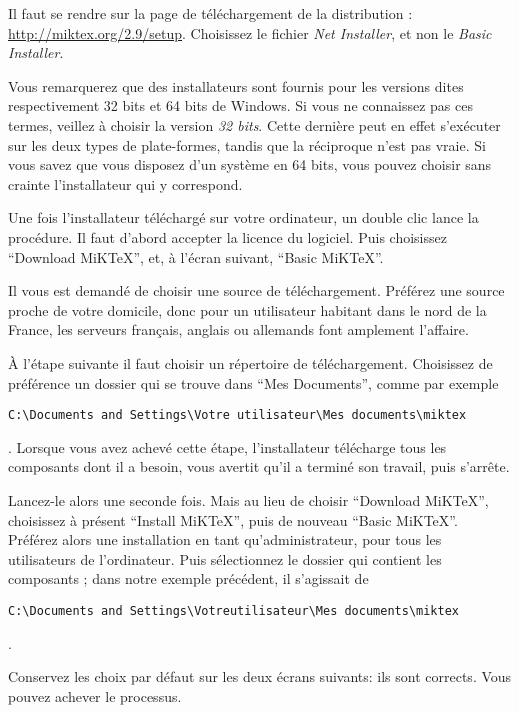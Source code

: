 Il faut se rendre sur la page de téléchargement de la distribution : \url{http://miktex.org/2.9/setup}. Choisissez le fichier \emph{Net Installer}, et non le \emph{Basic Installer}.

\begin{attention}
Vous remarquerez que des installateurs sont fournis pour les versions dites respectivement 32 bits et 64 bits de Windows. Si vous ne connaissez pas ces termes, veillez à choisir la version \emph{32 bits}. Cette dernière peut en effet s'exécuter sur les deux types de plate-formes, tandis que la réciproque n'est pas vraie. Si vous savez que vous disposez d'un système en 64 bits, vous pouvez choisir sans crainte l'installateur qui y correspond.
\end{attention}

Une fois l'installateur téléchargé sur votre ordinateur, un double clic lance la procédure. Il faut d'abord accepter la licence du logiciel. Puis choisissez \enquote{Download MiKTeX}, et, à l'écran suivant, \enquote{Basic MiKTeX}.

Il vous est demandé de choisir une source de téléchargement. Préférez une source proche de votre domicile, donc pour un utilisateur habitant dans le nord de la France, les serveurs français, anglais ou allemands font amplement l'affaire.

À l'étape suivante il faut choisir un répertoire de téléchargement. Choisissez de préférence un dossier qui se trouve dans \enquote{Mes Documents}, comme par exemple \begin{english}\verb|C:\Documents and Settings\Votre utilisateur\Mes documents\miktex|\end{english}. Lorsque vous avez achevé cette étape, l'installateur télécharge tous les composants dont il a besoin, vous avertit qu'il a terminé son travail, puis s'arrête.

Lancez-le alors une seconde fois. Mais au lieu de choisir \enquote{Download MiKTeX}, choisissez à présent \enquote{Install MiKTeX}, puis de nouveau \enquote{Basic MiKTeX}. Préférez alors une installation en tant qu'administrateur, pour tous les utilisateurs de l'ordinateur. Puis sélectionnez le dossier qui contient les composants ; dans notre exemple précédent, il s'agissait de \begin{english}\verb|C:\Documents and Settings\Votreutilisateur\Mes documents\miktex|\end{english}.

Conservez les choix par défaut sur les deux écrans suivants: ils sont corrects. Vous pouvez achever le processus.







